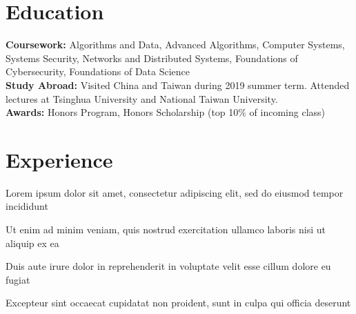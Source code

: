 \documentclass[]{deedy-resume}
\begin{document}

\vspace{2pt}

\sectionsep


\section{Education} 
\vspace{3pt}
\textbf{Coursework:} Algorithms and Data, Advanced Algorithms, Computer Systems, Systems Security, Networks and Distributed Systems, Foundations of Cybersecurity, Foundations of Data Science \\
\textbf{Study Abroad:} Visited China and Taiwan during 2019 summer term. Attended lectures at Tsinghua University and National Taiwan University. \\
\textbf{Awards:} Honors Program, Honors Scholarship (top 10\% of incoming class)
\sectionsep


\section{Experience}
\begin{tightemize}
\item Lorem ipsum dolor sit amet, consectetur adipiscing elit, sed do eiusmod tempor incididunt
\item Ut enim ad minim veniam, quis nostrud exercitation ullamco laboris nisi ut aliquip ex ea
\item Duis aute irure dolor in reprehenderit in voluptate velit esse cillum dolore eu fugiat
\item Excepteur sint occaecat cupidatat non proident, sunt in culpa qui officia deserunt
\end{tightemize}
\sectionsep
\end{document}
